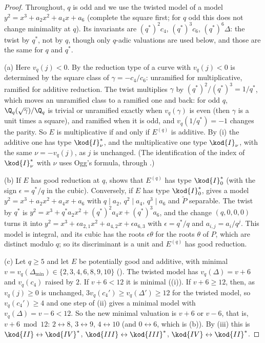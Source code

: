 \begin{proof}
Throughout, $q$ is odd and we use the twisted model of a model $y^2=x^3+a_2x^2+a_4x+a_6$ (complete the square first; for $q$ odd
this does not change minimality at $q$). Its invariants are $(q^*)^2c_4$, $(q^*)^3c_6$, $(q^*)^6\Delta$: the twist by $q^*$, not
by $q$, though only $q$-adic valuations are used below, and those are the same for $q$ and $q^*$.

(a) Here $v_q(j)<0$. By  the reduction type of a curve with $v_q(j)<0$ is determined by
the square class of $\gamma=-c_4/c_6$: unramified for multiplicative, ramified for additive reduction. The twist multiplies $\gamma$
by $(q^*)^{2}/(q^*)^{3}=1/q^*$, which moves an unramified class to a ramified one and back: for odd $q$, $\Q_q(\sqrt\gamma)/\Q_q$
is trivial or unramified exactly when $v_q(\gamma)$ is even (then $\gamma$ is a unit times a square), and ramified when it is odd,
and $v_q(1/q^*)=-1$ changes the parity. So $E$ is multiplicative if and only if
$E^{(q)}$ is additive. By (i) the additive one has type $\kod{I}_\nu^*$, and the multiplicative
one type $\kod{I}_\nu$, with the same $\nu=-v_q(j)$, as $j$ is unchanged. (The identification of the index of $\kod{I}_\nu^*$
with $\nu$ uses Ogg's formula, through .)

(b) If $E$ has good reduction at $q$,  shows that $E^{(q)}$ has type $\kod{I}_0^*$ (with the sign
$\epsilon=q^*/q$ in the cubic). Conversely, if $E$ has type $\kod{I}_0^*$,  gives a model
$y^2=x^3+a_2x^2+a_4x+a_6$ with $q\mid a_2$, $q^2\mid a_4$, $q^3\mid a_6$ and $\tilde P$ separable. The twist by $q^*$ is
$y^2=x^3+q^*a_2x^2+(q^*)^2a_4x+(q^*)^3a_6$, and the change $(q,0,0,0)$ turns it into
$y^2=x^3+\epsilon a_{2,1}x^2+a_{4,2}x+\epsilon a_{6,3}$ with $\epsilon=q^*/q$ and $a_{i,j}=a_i/q^j$. This model is integral, and its cubic
has the roots $\epsilon\theta$ for the roots $\theta$ of $P$, which are distinct modulo $q$; so its discriminant is a unit and $E^{(q)}$ has good
reduction.

(c) Let $q\ge5$ and let $E$ be potentially good and additive, with minimal $v=v_q(\Delta_{\min})\in\{2,3,4,6,8,9,10\}$
(). The twisted model has $v_q(\Delta)=v+6$ and $v_q(c_4)$ raised by $2$. If $v+6<12$ it is minimal
((i)). If $v+6\ge12$, then, as $v_q(j)\ge0$ is unchanged, $3v_q(c_4')\ge v_q(\Delta')\ge12$ for the twisted
model, so $v_q(c_4')\ge4$ and one step of (ii) gives a minimal model with $v_q(\Delta)=v-6<12$. So the
new minimal valuation is $v+6$ or $v-6$, that is, $v+6\bmod12$: $2\leftrightarrow8$, $3\leftrightarrow9$, $4\leftrightarrow10$ (and $0\leftrightarrow6$, which is (b)).
By (iii) this is $\kod{II}\leftrightarrow\kod{IV}^*$, $\kod{III}\leftrightarrow\kod{III}^*$,
$\kod{IV}\leftrightarrow\kod{II}^*$.


\end{proof}
